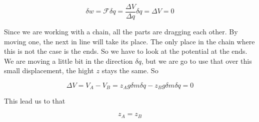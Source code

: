 \documentclass[a4paper,norsk, 10pt]{article}
\begin{document}
$$
\delta w = \mathcal{F}\delta q = \frac{\Delta V}{\Delta q} \delta q = \Delta V = 0
$$

Since we are working with a chain, all the parts are dragging each other. By moving one, the next in line will take its place. The only place in the chain where this is not the case is the ends. So we have to look at the potential at the ends. We are moving a little bit in the direction $\delta q$, but we are go to use that over this small displacement, the hight $z$ stays the same. So

$$
\Delta V = V_A - V_B = z_A g\delta m  \delta q  - z_B g\delta m \delta q= 0
$$

This lead us to that

$$
z_A = z_B
$$
\end{document}
